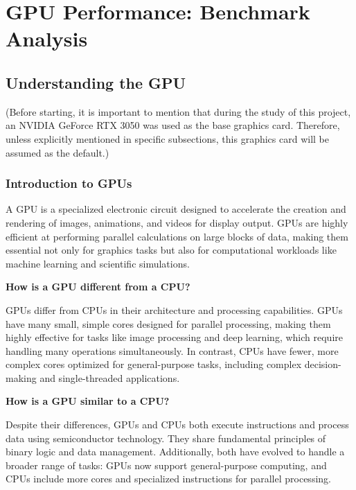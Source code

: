 \section{GPU Performance: Benchmark Analysis}

\subsection{Understanding the GPU}

(Before starting, it is important to mention that during the study of this project, an NVIDIA GeForce RTX 3050 was used as the base graphics card. Therefore, unless explicitly mentioned in specific subsections, this graphics card will be assumed as the default.)

\subsubsection{Introduction to GPUs}

A GPU is a specialized electronic circuit designed to accelerate the creation and rendering of images, animations, and videos for display output. GPUs are highly efficient at performing parallel calculations on large blocks of data, making them essential not only for graphics tasks but also for computational workloads like machine learning and scientific simulations.

\begin{center}
\textbf{How is a GPU different from a CPU?}
\end{center}
GPUs differ from CPUs in their architecture and processing capabilities. GPUs have many small, simple cores designed for parallel processing, making them highly effective for tasks like image processing and deep learning, which require handling many operations simultaneously. In contrast, CPUs have fewer, more complex cores optimized for general-purpose tasks, including complex decision-making and single-threaded applications.

\begin{center}
\textbf{How is a GPU similar to a CPU?} 
\end{center}
Despite their differences, GPUs and CPUs both execute instructions and process data using semiconductor technology. They share fundamental principles of binary logic and data management. Additionally, both have evolved to handle a broader range of tasks: GPUs now support general-purpose computing, and CPUs include more cores and specialized instructions for parallel processing.

